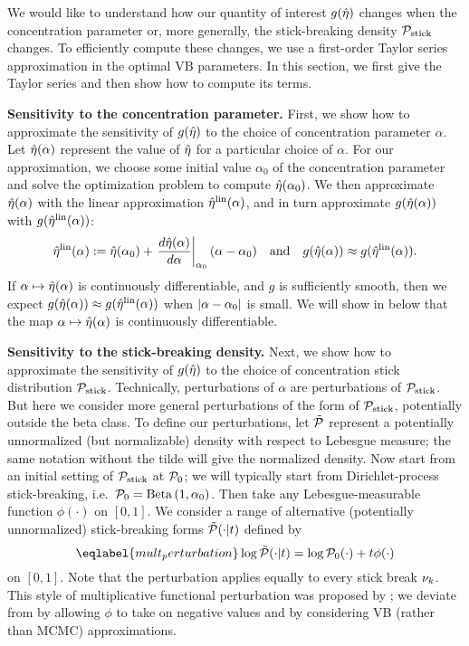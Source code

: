We would like to understand how our quantity of interest $g(\hat\eta)$ changes
when the concentration parameter or, more generally, the stick-breaking density
$\mathcal{P}_{\mathrm{stick}}$ changes. To efficiently compute these changes, we use a first-order
Taylor series approximation in the optimal VB parameters. In this section, we
first give the Taylor series and then show how to compute its terms.

\noindent \textbf{Sensitivity to the concentration parameter.} First, we show
how to approximate the sensitivity of $g(\hat\eta)$ to the choice of
concentration parameter $\alpha$. Let $\hat\eta(\alpha)$ represent the value of
$\hat\eta$ for a particular choice of $\alpha$. For our approximation, we choose
some initial value $\alpha_0$ of the concentration parameter and solve the
optimization problem to compute $\hat\eta(\alpha_0)$. We then approximate
$\hat\eta(\alpha)$ with the linear approximation $\hat\eta^{\mathrm{lin}}(\alpha)$, and in turn
approximate $g(\hat\eta(\alpha))$ with $g(\hat\eta^{\mathrm{lin}}(\alpha))$:
%
\begin{align*}
%
\etalin(\alpha) :=
    \etaopt(\alpha_0) +
    \fracat{d\etaopt(\alpha)}{d\alpha}{\alpha_0} (\alpha - \alpha_0)
\mathand
g(\etaopt(\alpha)) \approx g(\etalin(\alpha)).
%
\end{align*}
%
If $\alpha \mapsto \hat\eta(\alpha)$ is continuously differentiable, and $g$ is
sufficiently smooth, then we expect $g(\hat\eta(\alpha)) \approx
g(\hat\eta^{\mathrm{lin}}(\alpha))$ when $\left|\alpha - \alpha_0\right|$ is small. We will show in
 below that the map $\alpha \mapsto \hat\eta(\alpha)$ is
continuously differentiable.

\noindent \textbf{Sensitivity to the stick-breaking density.} Next, we show how
to approximate the sensitivity of $g(\hat\eta)$ to the choice of concentration
stick distribution $\mathcal{P}_{\mathrm{stick}}$. Technically, perturbations of $\alpha$ are
perturbations of $\mathcal{P}_{\mathrm{stick}}$. But here we consider more general perturbations of
the form of $\mathcal{P}_{\mathrm{stick}}$, potentially outside the beta class. To define our
perturbations, let $\tilde{\mathcal{P}}$ represent a potentially unnormalized (but
normalizable) density with respect to Lebesgue measure; the same notation
without the tilde will give the normalized density. Now start from an initial
setting of $\mathcal{P}_{\mathrm{stick}}$ at $\mathcal{P}_{0}$; we will typically start from Dirichlet-process
stick-breaking, i.e.\ $\mathcal{P}_{0} = \mathrm{Beta}\left(1,\alpha_0\right)$. Then take any
Lebesgue-measurable function $\phi(\cdot)$ on $[0,1]$. We consider a range of
alternative (potentially unnormalized) stick-breaking forms $\tilde{\mathcal{P}}(\cdot \vert
t)$ defined by
%
\begin{equation} \eqlabel{mult_perturbation}
	\log \ptil(\cdot \vert \t) = \log \pbase(\cdot) + \t \phi(\cdot)
\end{equation}
%
on $[0,1]$. Note that the perturbation applies equally to every stick break
$\nu_{k}$. This style of multiplicative functional perturbation was proposed by
\citet{gustafson:1996:local}; we deviate from \citet{gustafson:1996:local} by
allowing $\phi$ to take on negative values and by considering VB (rather than
MCMC) approximations.

